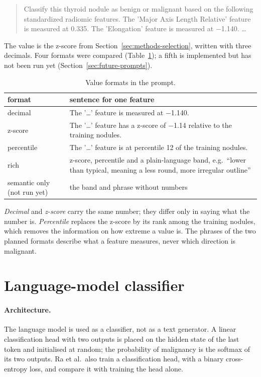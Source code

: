 \begin{quote}\small
Classify this thyroid nodule as benign or malignant based on the following standardized radiomic
features. The 'Major Axis Length Relative' feature is measured at 0.335. The 'Elongation' feature
is measured at $-$1.140. \dots
\end{quote}

The value is the z-score from Section~\ref{sec:methods-selection}, written with three decimals.
Four formats were compared (Table~\ref{tab:methods-formats}); a fifth is implemented but has not
been run yet (Section~\ref{sec:future-prompts}).

\begin{table}[ht]
  \centering
  \caption{Value formats in the prompt.}
  \label{tab:methods-formats}
  \begin{tabularx}{\linewidth}{l>{\raggedright\arraybackslash}X}
    \toprule
    format & sentence for one feature \\
    \midrule
    decimal    & The '\dots' feature is measured at $-$1.140. \\
    z-score    & The '\dots' feature has a z-score of $-$1.14 relative to the training nodules. \\
    percentile & The '\dots' feature is at percentile 12 of the training nodules. \\
    \midrule
    rich & z-score, percentile and a plain-language band, e.g.\ ``lower than
                         typical, meaning a less round, more irregular outline'' \\
    semantic only (not run yet) & the band and phrase without numbers \\
    \bottomrule
  \end{tabularx}
\end{table}

\emph{Decimal} and \emph{z-score} carry the same number; they differ only in saying what the
number is. \emph{Percentile} replaces the z-score by its rank among the training nodules, which
removes the information on how extreme a value is. The phrases of the two planned formats
describe what a feature measures, never which direction is malignant.

\section{Language-model classifier}
\label{sec:methods-llm}

\paragraph{Architecture.} The language model is used as a classifier, not as a text generator. A
linear classification head with two outputs is placed on the hidden state of the last token and
initialised at random; the probability of malignancy is the softmax of its two outputs. Ra et al.\
also train a classification head, with a binary cross-entropy loss, and compare it with training
the head alone.

